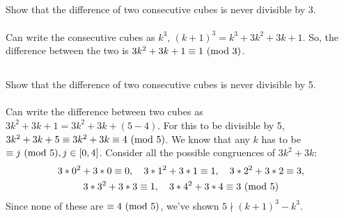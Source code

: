 \documentclass{article}
\begin{document}
\subsection{}
Show that the difference of two consecutive cubes is never divisible by 3.\\~\\
Can write the consecutive cubes as $k^3$, $(k + 1)^3 = k^3 + 3k^2 + 3k + 1$.
So, the difference between the two is $3k^2 + 3k + 1 \equiv 1 \ (\mathrm{mod}\ 3)$.

\subsection{}
Show that the difference of two consecutive cubes is never divisible by 5.\\~\\
Can write the difference between two cubes as $3k^2 + 3k + 1 = 3k^2 + 3k + (5 - 4)$.
For this to be divisible by 5, $3k^2 + 3k + 5 \equiv 3k^2 + 3k \equiv 4 \ (\mathrm{mod}\ 5)$.
We know that any $k$ has to be $\equiv j \ (\mathrm{mod}\ 5), j \in [0, 4]$.
Consider all the possible congruences of $3k^2 + 3k$:
\begin{gather*}
    3 * 0^2 + 3 * 0 \equiv 0, \quad 3 * 1^2 + 3 * 1 \equiv 1, \quad
    3 * 2^2 + 3 * 2 \equiv 3, \\
    3 * 3^2 + 3 * 3 \equiv 1, \quad 3 * 4^2 + 3 * 4 \equiv 3 \ (\mathrm{mod}\ 5)
\end{gather*}
Since none of these are $\equiv 4 \ (\mathrm{mod}\ 5)$, we've shown $5 \nmid (k + 1)^3 - k^3$.

\end{document}
